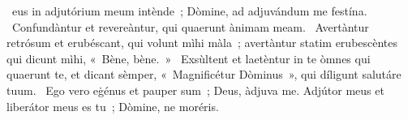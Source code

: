{ }
{%
~eus in adjutórium meum intènde~; Dòmine, ad adjuvándum me festína. 
~Confundàntur et revereàntur, qui quaerunt ànimam meam. 
~Avertàntur retrósum et erubéscant, qui volunt mìhi màla~; avertàntur statim erubescèntes qui dicunt mìhi, «~Bène, bène.~» 
~Exsùltent et laetèntur in te òmnes qui quaerunt te, et dicant sèmper, «~Magnificétur Dòminus~», qui díligunt salutáre tuum. 
~Ego vero eġénus et pauper sum~; Deus, àdjuva me. Adjútor meus et liberátor meus es tu~; Dòmine, ne moréris. 
}
